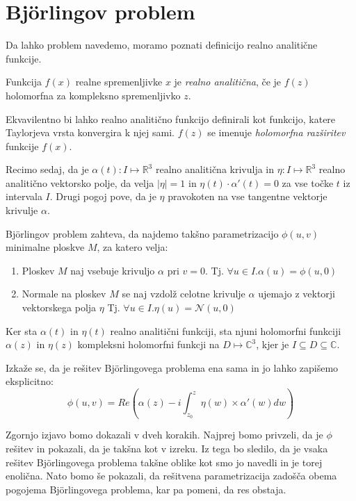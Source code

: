 \documentclass[mat1]{fmfdelo}
\newcommand{\R}{\mathbb R}
\newcommand{\C}{\mathbb C}
\begin{document}
\section{Björlingov problem}

Da lahko problem navedemo, moramo poznati definicijo realno analitične funkcije.

\begin{definicija}
    Funkcija $f(x)$ realne spremenljivke $x$ je \emph{realno analitična}, če je $f(z)$ 
    holomorfna za kompleksno spremenljivko $z$.
\end{definicija}

Ekvavilentno bi lahko realno analitično funkcijo definirali kot funkcijo, katere Taylorjeva
vrsta konvergira k njej sami. $f(z)$ se imenuje \emph{holomorfna razširitev} funkcije $f(x)$.


Recimo sedaj, da je $\alpha (t) : I \mapsto \R^3$ realno analitična krivulja in $\eta : I \mapsto \R^3$ 
realno analitično vektorsko polje, da velja $ \left\lvert \eta \right\rvert = 1$ in $\eta (t) \cdot \alpha' (t) = 0$ 
za vse točke $t$ iz intervala $I$. Drugi pogoj pove, da je $\eta$ pravokoten na vse tangentne vektorje krivulje $\alpha$.

Björlingov problem zahteva, da najdemo takšno parametrizacijo $\phi (u, v)$ minimalne ploskve $M$, za katero velja:
\begin{enumerate}
    \item Ploskev $M$ naj vsebuje krivuljo $\alpha$ pri $v = 0$. Tj. $\forall u \in I. \alpha (u) = \phi (u, 0)$
    \item Normale na ploskev $M$ se naj vzdolž celotne krivulje $\alpha$ ujemajo z vektorji vektorskega polja $\eta$ 
    Tj. $\forall u \in I. \eta (u) = \mathcal{N} (u, 0)$
\end{enumerate}

Ker sta $\alpha(t)$ in $\eta(t)$ realno analitični funkciji, sta njuni holomorfni funkciji $\alpha(z)$ 
in $\eta(z)$ kompleksni holomorfni funkcji na $D \mapsto \C^3$, kjer je $I \subseteq D \subseteq \C$.

Izkaže se, da je rešitev Björlingovega problema ena sama in jo lahko zapišemo eksplicitno:
$$ \phi (u, v) = Re \left( \alpha (z) - i \int_{z_0}^{z} \eta (w) \times \alpha' (w) dw \right) $$

Zgornjo izjavo bomo dokazali v dveh korakih. Najprej bomo privzeli, da je $\phi$ rešitev in pokazali,
da je takšna kot v izreku. Iz tega bo sledilo, da je vsaka rešitev Björlingovega problema takšne oblike 
kot smo jo navedli in je torej enolična. Nato bomo še pokazali, da rešitvena parametrizacija zadošča 
obema pogojema Björlingovega problema, kar pa pomeni, da res obstaja.
\end{document}
